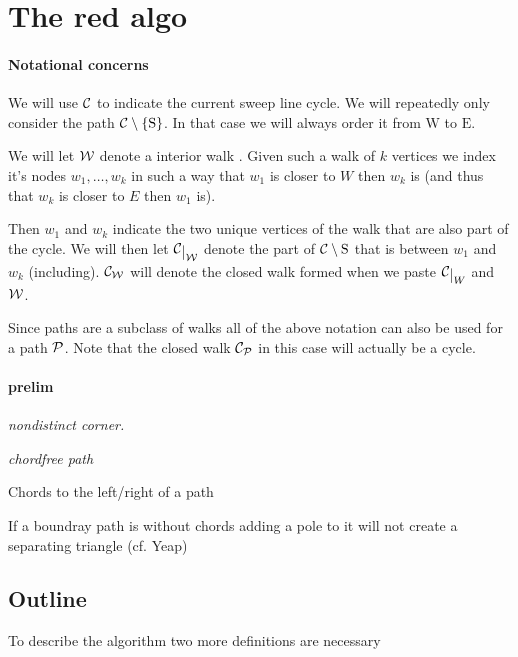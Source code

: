 \newcommand{\mrN}{\mathrm{N}}
\newcommand{\mrS}{\mathrm{S}}
\newcommand{\mrE}{\mathrm{E}}
\newcommand{\mrW}{\mathrm{W}}


\section{The red algo}
\paragraph{Notational concerns}
We will use $\C$ to indicate the current sweep line cycle.
We will repeatedly only consider the path $\cpath$. In that case we will always order it from $\mrW$ to $\mrE$.

We will let $\W$ denote a interior walk  . Given such a walk of $k$ vertices we index it's nodes $w_1, \ldots, w_k$  in such a way that $w_1$ is closer to $W$ then $w_k$ is (and thus that $w_k$ is closer to $E$ then $w_1$ is).

Then $w_1$ and $w_k$ indicate the two unique vertices of the walk that are also part of the cycle. We will then let $\restC{\W}$ denote the part of $\C\setminus {\mathrm{S}}$ that is between $w_1$ and $w_k$ (including). $\C_\W$ will denote the closed walk formed when we paste $\restC{W}$ and $\W$.

Since paths are a subclass of walks all of the above notation can also be used for a path $\P$. Note that the closed walk $\C_\P$ in this case will actually be a cycle.


\paragraph{prelim}
\emph{nondistinct corner.}

\emph{chordfree path}

Chords to the left/right of a path

\begin{lemma}
If a boundray path is without chords adding a pole to it will not create a separating triangle (cf. Yeap)
\end{lemma}




\subsection{Outline}
To describe the algorithm two  more definitions are necessary

